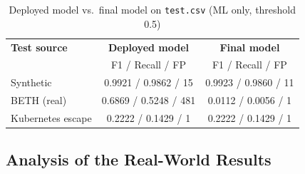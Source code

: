 \begin{table}[H]
\centering
\caption{Deployed model vs.\ final model on \texttt{test.csv} (ML only, threshold 0.5)}
\label{tab:compare}
\small
\begin{tabular}{lcc}
\toprule
\textbf{Test source} & \textbf{Deployed model} & \textbf{Final model} \\
 & F1 / Recall / FP & F1 / Recall / FP \\
\midrule
Synthetic          & 0.9921 / 0.9862 / 15  & 0.9923 / 0.9860 / 11 \\
BETH (real)        & 0.6869 / 0.5248 / 481 & 0.0112 / 0.0056 / 1 \\
Kubernetes escape  & 0.2222 / 0.1429 / 1   & 0.2222 / 0.1429 / 1 \\
\bottomrule
\end{tabular}
\end{table}

\subsection{Analysis of the Real-World Results}

